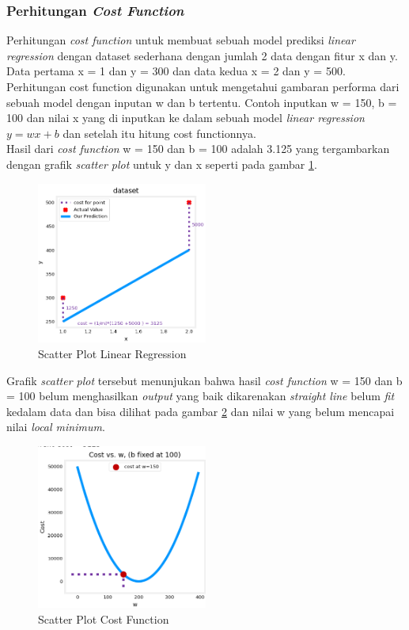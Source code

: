 \subsubsection{Perhitungan \textit{Cost Function}} \label{II.costfunction}
Perhitungan \textit{cost function} untuk membuat sebuah model prediksi \textit{linear regression} dengan dataset sederhana dengan jumlah 2 data dengan fitur x dan y. Data pertama x = 1 dan y = 300 dan data kedua x = 2 dan y = 500.\\ 
Perhitungan cost function digunakan untuk mengetahui gambaran performa dari sebuah model dengan inputan w dan b tertentu. Contoh inputkan w = 150, b = 100 dan nilai x yang di inputkan ke dalam sebuah model \textit{linear regression} $y = wx + b$ dan setelah itu hitung cost functionnya.\\
Hasil dari \textit{cost function} w = 150 dan b = 100 adalah 3.125 yang tergambarkan dengan grafik \textit{scatter plot} untuk y dan x seperti pada gambar \ref{fig:2.scatterplotlinear}.
\begin{figure}[H] %
    \centering
    \includegraphics[width=0.5\textwidth]{figure/scatter plot linear regression.png}
    \caption{Scatter Plot Linear Regression}
    \label{fig:2.scatterplotlinear}
\end{figure}
Grafik \textit{scatter plot} tersebut menunjukan bahwa hasil \textit{cost function} w = 150 dan b = 100 belum menghasilkan \textit{output} yang baik dikarenakan \textit{straight line} belum \textit{fit} kedalam data dan bisa dilihat pada gambar \ref{fig:2.scatterplotcost} dan nilai w yang belum mencapai nilai \textit{local minimum}.
\begin{figure}[H] %
    \centering
    \includegraphics[width=0.5\textwidth]{figure/Scatter plot cost function.png}
    \caption{Scatter Plot Cost Function}
    \label{fig:2.scatterplotcost}
\end{figure}

